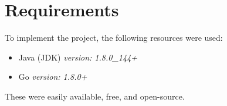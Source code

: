 \documentclass[12pt,letterpaper,oneside,titlepage]{report}
\begin{document}
  

  \cleardoublepage
  \tableofcontents %
  \pagebreak %
  \cleardoublepage %
  \vfill %

  
  

  \section{Requirements}
  To implement the project, the following resources were used: \par

  \begin{itemize}
    \item Java (JDK) {\em version: 1.8.0\_144+}
    \item Go {\em version: 1.8.0+}
  \end{itemize}

  {\raggedleft These were easily available, free, and open-source.}

  
  
   

  
  {}
\end{document}
